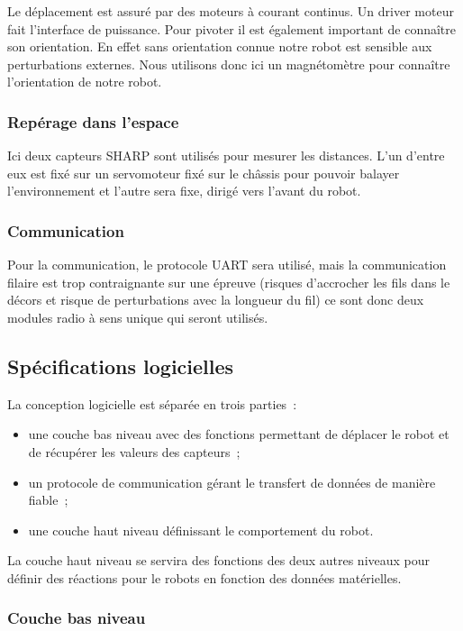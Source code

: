 \documentclass{article}
\begin{document}
Le déplacement est assuré par des moteurs à courant continus. Un driver moteur fait l'interface de puissance. Pour pivoter il est également important de connaître son orientation. En effet sans orientation connue notre robot est sensible aux perturbations externes. Nous utilisons donc ici un magnétomètre pour connaître l’orientation de notre robot.

\subsubsection{Repérage dans l'espace}

Ici deux capteurs SHARP sont utilisés pour mesurer les distances. L’un d’entre eux est fixé sur un servomoteur fixé sur le châssis pour pouvoir balayer l’environnement et l’autre sera fixe, dirigé vers l’avant du robot.

\subsubsection{Communication}

Pour la communication, le protocole UART sera utilisé, mais la communication filaire est trop contraignante sur une épreuve (risques d’accrocher les fils dans le décors et risque de perturbations  avec la longueur du fil) ce sont donc deux modules radio à sens unique qui seront utilisés.

\subsection{Spécifications logicielles}

La conception logicielle est séparée en trois parties~: \\

\begin{itemize}
  \item une couche bas niveau avec des fonctions permettant de déplacer le robot et de récupérer les valeurs des capteurs~;
  \item un protocole de communication gérant le transfert de données de manière fiable~;
  \item une couche haut niveau définissant le comportement du robot.
\end{itemize}

La couche haut niveau se servira des fonctions des deux autres niveaux pour définir des réactions pour le robots en fonction des données matérielles.

\subsubsection{Couche bas niveau}
\end{document}
